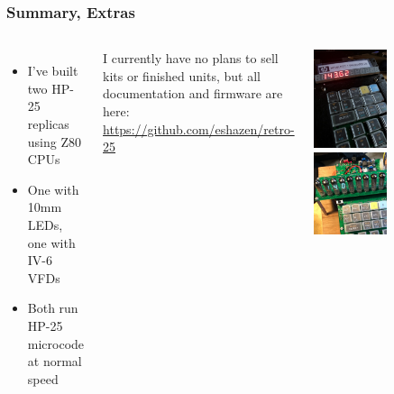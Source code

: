 \documentclass{beamer}
\begin{document}
\begin{frame}
\begin{columns}
  \end{columns}
\end{frame}

\begin{frame}
  \frametitle{Summary, Extras}

  \begin{columns}
    \begin{itemize}
    \scriptsize
    \item I've built two HP-25 replicas using Z80 CPUs
    \item One with 10mm LEDs, one with IV-6 VFDs
    \item Both run HP-25 microcode at normal speed
    \end{itemize}
    \vskip 0.2in
    \scriptsize
    I currently have no plans to sell kits or finished
    units, but all documentation and firmware are here:
    \url{https://github.com/eshazen/retro-25}

    \includegraphics[width=0.5\textwidth]{figs/led-close.jpg}
    \vskip 0.2in
    \includegraphics[width=0.5\textwidth]{figs/vfd-zoom.jpg}
  \end{columns}
\end{frame}
\end{document}
